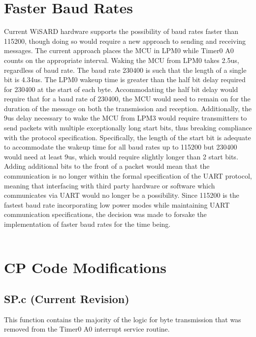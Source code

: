 \documentclass{article}
\begin{document}
\section{Faster Baud Rates}
Current WiSARD hardware supports the possibility of baud rates faster than 115200, though doing so would require a new approach to sending and receiving messages. The current approach places the MCU in LPM0 while Timer0 A0 counts on the appropriate interval. Waking the MCU from LPM0 takes 2.5us, regardless of baud rate. The baud rate 230400 is such that the length of a single bit is 4.34us. The LPM0 wakeup time is greater than the half bit delay required for 230400 at the start of each byte. Accommodating the half bit delay would require that for a baud rate of 230400, the MCU would need to remain on for the duration of the message on both the transmission and reception. Additionally, the 9us delay necessary to wake the MCU from LPM3 would require transmitters to send packets with multiple exceptionally long start bits, thus breaking compliance with the protocol specification. Specifically, the length of the start bit is adequate to accommodate the wakeup time for all baud rates up to 115200 but 230400 would need at least 9us, which would require slightly longer than 2 start bits. Adding additional bits to the front of a packet would mean that the communication is no longer within the formal specification of the UART protocol, meaning that interfacing with third party hardware or software which communicates via UART would no longer be a possibility. Since 115200 is the fastest baud rate incorporating low power modes while maintaining UART communication specifications, the decision was made to forsake the implementation of faster baud rates for the time being.
\\\\

\newpage
\appendix
\section{CP Code Modifications}

	\subsection{SP.c (Current Revision)}
This function contains the majority of the logic for byte transmission that was removed from the Timer0 A0 interrupt service routine.
	
\end{document}
